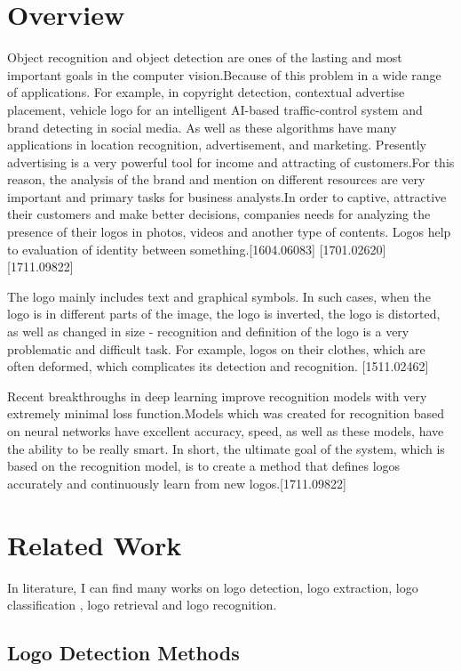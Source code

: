 \section{Overview} \label{sec:1.1}
\vspace{-0.5cm}
\par Object recognition and object detection are ones of the lasting and most important goals in the computer vision.Because of this problem in a wide range of applications. For example, in copyright detection, contextual advertise placement, vehicle logo for an intelligent AI-based traffic-control system and brand detecting in social media. As well as these algorithms have many applications in location recognition, advertisement, and marketing. Presently advertising is a very powerful tool for income and attracting of customers.For this reason, the analysis of the brand and mention on different resources are very important and primary tasks for business analysts.In order to captive, attractive their customers and make better decisions, companies needs for analyzing the presence of their logos in photos, videos and another type of contents. Logos help to evaluation of identity between something.[1604.06083] [1701.02620] [1711.09822]

\vspace{-0.5cm}
\par The logo mainly includes text and graphical symbols. In such cases, when the logo is in different parts of the image, the logo is inverted, the logo is distorted, as well as changed in size - recognition and definition of the logo is a very problematic and difficult task. For example, logos on their clothes, which are often deformed, which complicates its detection and recognition. [1511.02462]

\vspace{-0.5cm}
\par Recent breakthroughs in deep learning improve recognition models with very extremely minimal loss function.Models which was created for recognition based on neural networks have excellent accuracy, speed, as well as these models, have the ability to be really smart. In short, the ultimate goal of the system, which is based on the recognition model, is to create a method that defines logos accurately and continuously learn from new logos.[1711.09822]

\vspace{-0.3cm}
\section{Related Work}\label{sec:1.2}
\vspace{-0.5cm}
\noindent In literature, I can find many works on logo detection, logo extraction, logo classification , logo retrieval and logo recognition.

\vspace{-0.3cm}


\subsection{Logo Detection Methods}\label{sec:1.2.1}
\vspace{-0.5cm}
